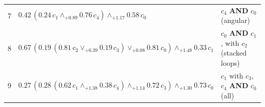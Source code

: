 \begin{table}[t]
\begin{center}
\begin{tabular}{c l l}
7 & $0.42\,(0.24\,c_{1}\mathbin{\wedge}_{+0.89}0.76\,c_{4})\mathbin{\wedge}_{+1.17}0.58\,c_{0}$ & $c_4$ \textbf{AND} $c_0$ (angular) \\[3pt]
8 & $0.67\,(0.19\,(0.81\,c_{2}\mathbin{\vee}_{+0.39}0.19\,c_{3})\mathbin{\vee}_{+0.08}0.81\,c_{0})\mathbin{\wedge}_{+1.48}0.33\,c_{1}$ & $c_0$ \textbf{AND} $c_1$, with $c_2$ (stacked loops) \\[3pt]
9 & $0.27\,(0.28\,(0.62\,c_{1}\mathbin{\wedge}_{+1.38}0.38\,c_{4})\mathbin{\wedge}_{+1.14}0.72\,c_{3})\mathbin{\wedge}_{+1.30}0.73\,c_{0}$ & $c_1$ with $c_3$, $c_4$ \textbf{AND} $c_0$ (all) \\[3pt]
\end{tabular}
\end{center}
\end{table}